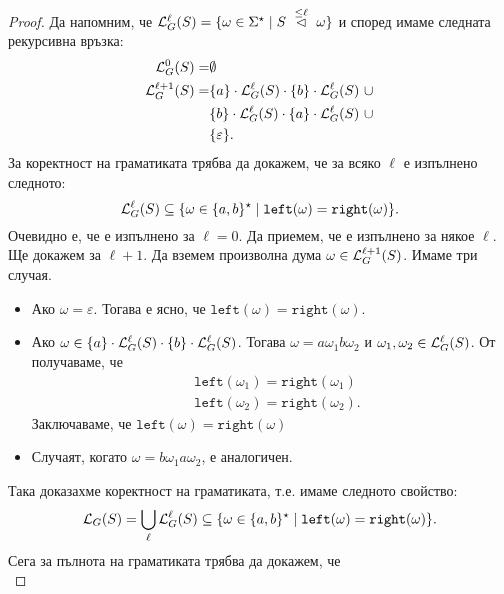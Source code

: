 \begin{proof}
  Да напомним, че $\mathcal{L}^\ell_G(S) = \{\omega \in \Sigma^\star \mid S ~\stackrel{{\leq \ell}}{\lhd}~ \omega\}$
  и според  имаме следната рекурсивна връзка:
  \begin{align*}
    \mathcal{L}^0_G(S) = & \emptyset\\
    \mathcal{L}^{\ell+1}_G(S) = & \{a\} \cdot \mathcal{L}^\ell_G(S) \cdot \{b\} \cdot \mathcal{L}^\ell_G(S)\ \cup\\
                & \{b\} \cdot \mathcal{L}^\ell_G(S) \cdot \{a\} \cdot \mathcal{L}^\ell_G(S)\ \cup\\
                & \{\varepsilon\}.
  \end{align*}
  За коректност на граматиката трябва да докажем, че за всяко $\ell$ е изпълнено следното:
  \begin{equation}
    \label{eq:equal-correctness}
    \mathcal{L}^\ell_G(S) \subseteq \{\omega \in \{a,b\}^\star \mid \texttt{left}(\omega) = \texttt{right}(\omega)\}.
  \end{equation}
  Очевидно е, че  е изпълнено за $\ell = 0$.
  Да приемем, че  е изпълнено за някое $\ell$.
  Ще докажем  за $\ell+1$.
  Да вземем произволна дума $\omega \in \mathcal{L}^{\ell+1}_G(S)$. Имаме три случая.
  \begin{itemize}
  \item
    Ако $\omega = \varepsilon$. Тогава е ясно, че $\texttt{left}(\omega) = \texttt{right}(\omega)$.
  \item
    Ако $\omega \in \{a\} \cdot \mathcal{L}^\ell_G(S) \cdot \{b\} \cdot \mathcal{L}^\ell_G(S)$.
    Тогава $\omega = a \omega_1 b \omega_2$ и $\omega_1, \omega_2 \in \mathcal{L}^\ell_G(S)$.
    От \IndHyp получаваме, че
    \begin{align*}
      & \texttt{left}(\omega_1) = \texttt{right}(\omega_1)\\
      & \texttt{left}(\omega_2) = \texttt{right}(\omega_2).
    \end{align*}
    Заключаваме, че $\texttt{left}(\omega) = \texttt{right}(\omega)$
  \item
    Случаят, когато $\omega = b \omega_1 a \omega_2$, е аналогичен.
  \end{itemize}
  Така доказахме коректност на граматиката, т.е. имаме следното свойство:
  \[\mathcal{L}_G(S) = \bigcup_\ell \mathcal{L}^\ell_G(S) \subseteq \{\omega \in \{a,b\}^\star \mid \texttt{left}(\omega) = \texttt{right}(\omega)\}.\]
  Сега за пълнота на граматиката трябва да докажем, че
  \begin{equation}
    \label{eq:equal-completeness}

\end{equation}
\end{proof}
